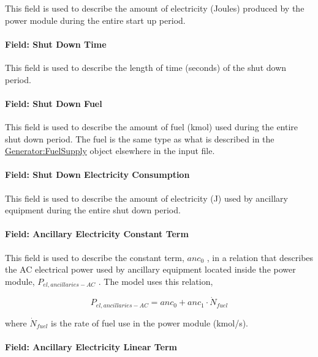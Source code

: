 This field is used to describe the amount of electricity (Joules) produced by the power module during the entire start up period.

\paragraph{Field: Shut Down Time}\label{field-shut-down-time}

This field is used to describe the length of time (seconds) of the shut down period.

\paragraph{Field: Shut Down Fuel}\label{field-shut-down-fuel}

This field is used to describe the amount of fuel (kmol) used during the entire shut down period. The fuel is the same type as what is described in the \hyperref[generatorfuelsupply]{Generator:FuelSupply} object elsewhere in the input file.

\paragraph{Field: Shut Down Electricity Consumption}\label{field-shut-down-electricity-consumption}

This field is used to describe the amount of electricity (J) used by ancillary equipment during the entire shut down period.

\paragraph{Field: Ancillary Electricity Constant Term}\label{field-ancillary-electricity-constant-term}

This field is used to describe the constant term, \(an{c_0}\) , in a relation that describes the AC electrical power used by ancillary equipment located inside the power module, \({P_{el,ancillaries - AC}}\) . The model uses this relation,

\begin{equation}
{P_{el,ancillaries - AC}} = an{c_0} + an{c_1} \cdot {\dot N_{fuel}}
\end{equation}

where \({\dot N_{fuel}}\) is the rate of fuel use in the power module (kmol/s).

\paragraph{Field: Ancillary Electricity Linear Term}\label{field-ancillary-electricity-linear-term}

